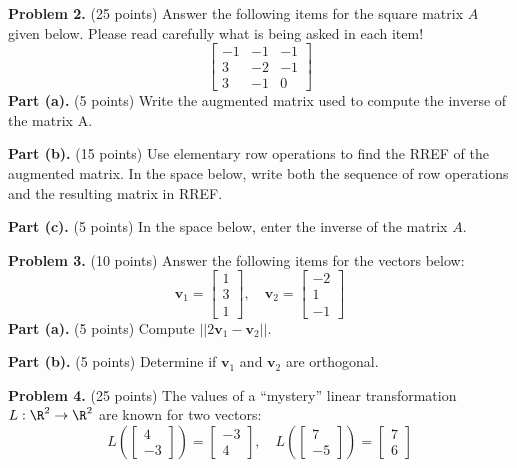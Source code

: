 \documentclass[12pt]{article}
\begin{document}
\textbf{Problem 2.} (25 points) Answer the following items for the square matrix $A$ given below. Please read carefully what is being asked in each item!
\[
\left[\begin{matrix}-1 & -1 & -1\\3 & -2 & -1\\3 & -1 & 0\end{matrix}\right]
\]
\textbf{Part (a).} (5 points) Write the augmented matrix used to compute the inverse of the matrix A.

\vskip1in

\textbf{Part (b).} (15 points) Use elementary row operations to find the RREF of the augmented matrix.
In the space below, write both the sequence of row operations and the resulting matrix in RREF.

\vskip3.5in

\textbf{Part (c).} (5 points) In the space below, enter the inverse of the matrix $A$.

\clearpage

\textbf{Problem 3.} (10 points) Answer the following items for the vectors below:
\[
\mathbf{v}_1=\left[\begin{matrix}1\\3\\1\end{matrix}\right],\quad
\mathbf{v}_2=\left[\begin{matrix}-2\\1\\-1\end{matrix}\right]
\]
\textbf{Part (a).} (5 points) Compute $||2\textbf{v}_1-\textbf{v}_2||$.

\vskip3.5in

\textbf{Part (b).} (5 points) Determine if $\textbf{v}_1$ and $\textbf{v}_2$ are orthogonal.

\clearpage

\textbf{Problem 4.} (25 points) The values of a ``mystery'' linear transformation $L:\R^2\to\R^2$ are known for two vectors:
\[
L\left(\left[\begin{matrix}4\\-3\end{matrix}\right]\right)=\left[\begin{matrix}-3\\4\end{matrix}\right],\quad L\left(\left[\begin{matrix}7\\-5\end{matrix}\right]\right)=\left[\begin{matrix}7\\6\end{matrix}\right]
\]
\end{document}
